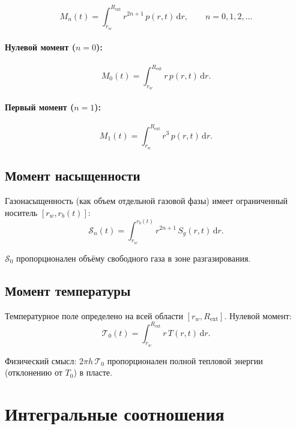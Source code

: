 \documentclass[12pt,a4paper]{article}
\newcommand{\dd}{\mathrm{d}}
\newcommand{\ext}{\mathrm{ext}}
\begin{document}
\begin{equation}\label{eq:Mn}
  M_n(t) = \int_{r_w}^{R_\ext} r^{2n+1}\,p(r,t)\,\dd r,
  \qquad n = 0, 1, 2, \ldots
\end{equation}

\paragraph{Нулевой момент ($n = 0$):}
\begin{equation}\label{eq:M0}
  M_0(t) = \int_{r_w}^{R_\ext} r\,p(r,t)\,\dd r.
\end{equation}

\paragraph{Первый момент ($n = 1$):}
\begin{equation}\label{eq:M1}
  M_1(t) = \int_{r_w}^{R_\ext} r^3\,p(r,t)\,\dd r.
\end{equation}

\subsection{Момент насыщенности}

Газонасыщенность (как объем отдельной газовой фазы) 
имеет ограниченный носитель $[r_w, r_b(t)]$:
\begin{equation}\label{eq:Sn}
  \mathcal{S}_n(t) = \int_{r_w}^{r_b(t)} r^{2n+1}\,S_g(r,t)\,\dd r.
\end{equation}

$\mathcal{S}_0$ пропорционален объёму свободного газа
в зоне разгазирования.

\subsection{Момент температуры}

Температурное поле определено на всей области $[r_w, R_\ext]$.
Нулевой момент:
\begin{equation}\label{eq:Tn}
  \mathcal{T}_0(t) = \int_{r_w}^{R_\ext} r\,T(r,t)\,\dd r.
\end{equation}

Физический смысл: $2\pi h\,\mathcal{T}_0$ пропорционален
полной тепловой энергии (отклонению от $T_0$) в пласте.


\section{Интегральные соотношения}\label{sec:integral_rel}
\end{document}
